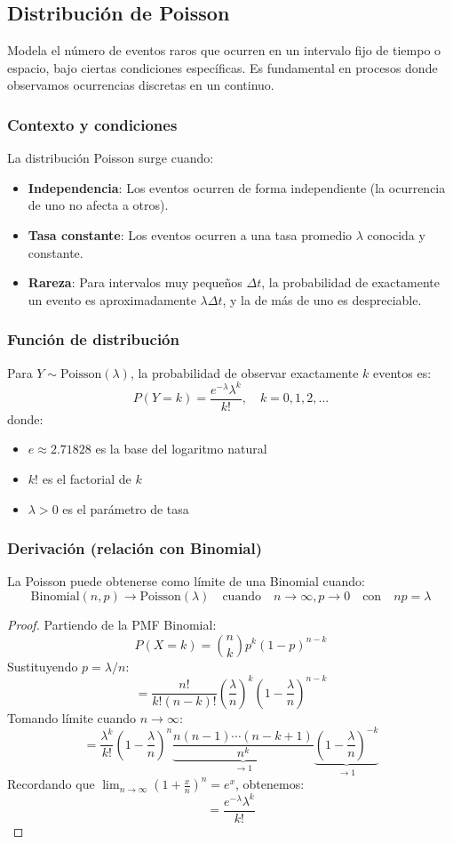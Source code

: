 \documentclass[letterpaper, 12pt]{article}
\begin{document}
	\subsection{Distribución de Poisson}
	Modela el número de eventos raros que ocurren en un intervalo fijo de tiempo o espacio, bajo ciertas condiciones específicas. Es fundamental en procesos donde observamos ocurrencias discretas en un continuo.
	
	\subsubsection{Contexto y condiciones}
	La distribución Poisson surge cuando:
	\begin{itemize}
		\item \textbf{Independencia}: Los eventos ocurren de forma independiente (la ocurrencia de uno no afecta a otros).
		\item \textbf{Tasa constante}: Los eventos ocurren a una tasa promedio $\lambda$ conocida y constante.
		\item \textbf{Rareza}: Para intervalos muy pequeños $\Delta t$, la probabilidad de exactamente un evento es aproximadamente $\lambda \Delta t$, y la de más de uno es despreciable.
	\end{itemize}
	
	\subsubsection{Función de distribución}
	Para $Y \sim \text{Poisson}(\lambda)$, la probabilidad de observar exactamente $k$ eventos es:
	\[
	P(Y = k) = \frac{e^{-\lambda} \lambda^k}{k!}, \quad k = 0,1,2,...
	\]
	donde:
	\begin{itemize}
		\item $e \approx 2.71828$ es la base del logaritmo natural
		\item $k!$ es el factorial de $k$
		\item $\lambda > 0$ es el parámetro de tasa
	\end{itemize}
	
	\subsubsection{Derivación (relación con Binomial)}
	La Poisson puede obtenerse como límite de una Binomial cuando:
	\[
	\text{Binomial}(n,p) \to \text{Poisson}(\lambda) \quad \text{cuando} \quad n \to \infty, p \to 0 \quad \text{con} \quad np = \lambda
	\]
	\begin{proof}
		Partiendo de la PMF Binomial:
		\[
		P(X=k) = \binom{n}{k} p^k (1-p)^{n-k}
		\]
		Sustituyendo $p = \lambda/n$:
		\[
		= \frac{n!}{k!(n-k)!} \left(\frac{\lambda}{n}\right)^k \left(1-\frac{\lambda}{n}\right)^{n-k}
		\]
		Tomando límite cuando $n \to \infty$:
		\[
		= \frac{\lambda^k}{k!} \left(1-\frac{\lambda}{n}\right)^n \underbrace{\frac{n(n-1)\cdots(n-k+1)}{n^k}}_{\to 1} \underbrace{\left(1-\frac{\lambda}{n}\right)^{-k}}_{\to 1}
		\]
		Recordando que $\lim_{n\to\infty}(1+\frac{x}{n})^n = e^x$, obtenemos:
		\[
		= \frac{e^{-\lambda} \lambda^k}{k!}
		\]
	\end{proof}
	
\end{document}
